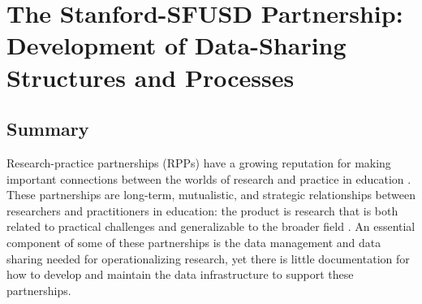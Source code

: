 \hypertarget{sfusd}{%
\chapter{The Stanford-SFUSD Partnership: Development of Data-Sharing Structures and Processes}\label{sfusd}}

\hrulefill

\hypertarget{summary-5}{%
\section{Summary}\label{summary-5}}

Research-practice partnerships (RPPs) have a growing reputation for making important connections between the worlds of research and practice in education \citep{farley-ripple2018, farrell2019}. These partnerships are long-term, mutualistic, and strategic relationships between researchers and practitioners in education: the product is research that is both related to practical challenges and generalizable to the broader field \citep{coburn2013, coburn2016}. An essential component of some of these partnerships is the data management and data sharing needed for operationalizing research, yet there is little documentation for how to develop and maintain the data infrastructure to support these partnerships.


